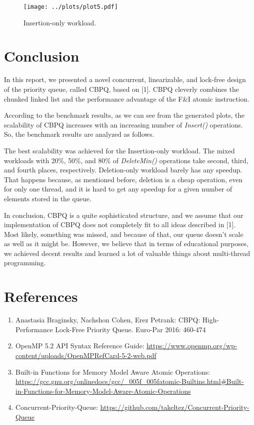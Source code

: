 \documentclass{article}
\begin{document}
\begin{figure}[H]
  \centering
  \texttt{[image: ../plots/plot5.pdf]}
  \caption{Insertion-only workload.}
  \label{fig:plot5}
\end{figure}

\section{Conclusion}
In this report, we presented a novel concurrent, linearizable, and lock-free design of the priority queue, called CBPQ, based on [1]. CBPQ cleverly combines the chunked linked list and the performance advantage of the F\&I atomic instruction.\par
According to the benchmark results, as we can see from the generated plots, the scalability of CBPQ increases with an increasing number of \textit{Insert()} operations. So, the benchmark results are analyzed as follows.\par

The best scalability was achieved for the Insertion-only workload. The mixed workloads with 20\%, 50\%, and 80\% of \textit{DeleteMin()} operations take second, third, and fourth places, respectively. Deletion-only workload barely has any speedup. That happens because, as mentioned before, deletion is a cheap operation, even for only one thread, and it is hard to get any speedup for a given number of elements stored in the queue.\par

In conclusion, CBPQ is a quite sophisticated structure, and we assume that our implementation of CBPQ does not completely fit to all ideas described in [1]. Most likely, something was missed, and because of that, our queue doesn't scale as well as it might be. However, we believe that in terms of educational purposes, we achieved decent results and learned a lot of valuable things about multi-thread programming.

\pagebreak
\section*{References}
\begin{enumerate}
\item{Anastasia Braginsky, Nachshon Cohen, Erez Petrank: CBPQ: High-Performance Lock-Free Priority Queue. Euro-Par 2016: 460-474}
\item{OpenMP 5.2 API Syntax Reference Guide: \url{https://www.openmp.org/wp-content/uploads/OpenMPRefCard-5-2-web.pdf}}
\item{Built-in Functions for Memory Model Aware Atomic Operations: \url{https://gcc.gnu.org/onlinedocs/gcc/_005f_005fatomic-Builtins.html#Built-in-Functions-for-Memory-Model-Aware-Atomic-Operations}}
\item{Concurrent-Priority-Queue: \url{https://github.com/takeltez/Concurrent-Priority-Queue}}
\end{enumerate}
\end{document}
